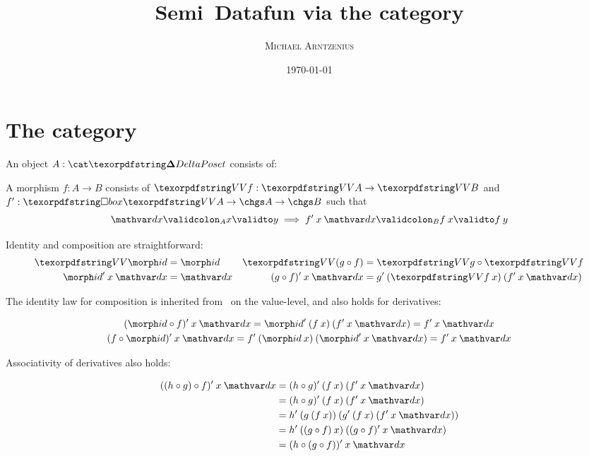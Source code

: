 \documentclass{rntz}
\title{Semi\naive\ Datafun via the category \CP}
\author{\scshape Michael Arntzenius}
\date{\today}
\begin{document}
\maketitle


\section{The category \CP}

An object $A : \CP$ consists of:

\noindent
A morphism $f : A \to B$ consists of $\vals f : \vals A \to \vals B$ and $f' :
\iso \vals A \to \chgs A \to \chgs B$ such that
%
\begin{equation}\label{eqn:derivative}
  \validat A \dx x y \implies \validat B {f'\<x \<\dx}{f\<x}{f\<y}
\end{equation}

\noindent
Identity and composition are straightforward:
%
\begin{align*}
  \vals \id &= \id
  & \vals (g \circ f) &= \vals g \circ \vals f
  \\
  \id' \<x \<\dx &= \dx
  & (g \circ f)' \<x \<\dx &= g' \<(\vals f\<x) \<(f' \<x \<\dx)
\end{align*}

\noindent The identity law for composition is inherited from \Poset\ on the
value-level, and also holds for derivatives:

\begin{gather*}
  (\id \circ f)' \<x \<\dx = \id' \<(f\<x) \<(f'\<x\<\dx)
  = f'\<x\<\dx
  \\
  (f \circ \id)' \<x \<\dx = f' \<(\id\<x) \<(\id'\<x\<\dx)
  = f' \<x \<\dx
\end{gather*}

\noindent
Associativity of derivatives also holds:

\begin{align*}
  ((h \circ g) \circ f)' \<x \<\dx
  &= (h \circ g)' \<(f\<x) \<(f'\<x\<\dx)
  \\
  &= (h \circ g)' \<(f\<x) \<(f'\<x\<\dx)
  \\
  &= h' \<(g\<(f\<x)) \<(g' \<(f\<x) \<(f'\<x\<\dx))
  \\
  &= h' \<((g \circ f)\<x) \<((g \circ f)'\<x\<\dx)
  \\
  &= (h \circ (g \circ f))' \<x \<\dx
\end{align*}
\end{document}
